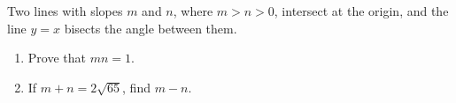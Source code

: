 Two lines with slopes $m$ and $n$, where $m>n>0$, intersect at the origin, and the line $y=x$ bisects the angle between them.
\begin{enumerate}
\item[(a)] Prove that $mn=1$.
\item[(b)] If $m+n=2\sqrt{65}$, find $m-n$.
\end{enumerate}
